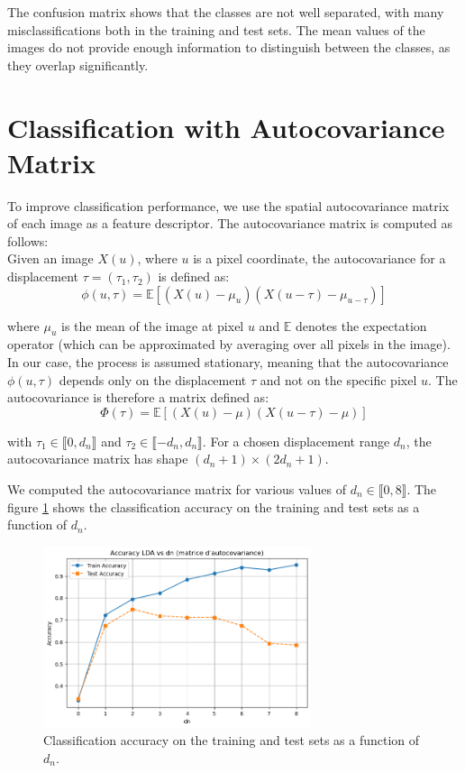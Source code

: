 \documentclass[12pt,a4paper]{article}
\begin{document}
The confusion matrix shows that the classes are not well separated, with many misclassifications both in the training and test sets.
The mean values of the images do not provide enough information to distinguish between the classes, as they overlap significantly.


\section{Classification with Autocovariance Matrix}

To improve classification performance, we use the spatial autocovariance matrix of each image as a feature descriptor.
The autocovariance matrix is computed as follows: \\

Given an image $X(u)$, where $u$ is a pixel coordinate, the autocovariance for a displacement $\tau = (\tau_1, \tau_2)$ is defined as:
\begin{equation}
    \phi(u, \tau) = \mathbb{E} [(X(u)-\mu_u)(X(u-\tau)-\mu_{u-\tau})]
\end{equation}

where $\mu_u$ is the mean of the image at pixel $u$ and $\mathbb{E}$ denotes the expectation operator (which can be approximated by averaging over all pixels in the image). \\

In our case, the process is assumed stationary, meaning that the autocovariance $\phi(u, \tau)$ depends only on the displacement $\tau$ and not on the specific pixel $u$.
The autocovariance is therefore a matrix defined as:
\begin{equation}
    \Phi(\tau) = \mathbb{E} [(X(u)-\mu)(X(u-\tau)-\mu)]
\end{equation}

with $\tau_1 \in \llbracket 0, d_n \rrbracket$ and $\tau_2 \in \llbracket -d_n, d_n \rrbracket$.
For a chosen displacement range $d_n$, the autocovariance matrix has shape $(d_n + 1) \times (2d_n + 1)$. \\

\newpage

We computed the autocovariance matrix for various values of $d_n \in \llbracket 0, 8 \rrbracket$.
The figure \ref{fig:accuracy_dn} shows the classification accuracy on the training and test sets as a function of $d_n$.
\begin{figure}[H]
    \centering
    \includegraphics[width=0.7\textwidth]{src/accuracy_dn.png}
    \caption{Classification accuracy on the training and test sets as a function of $d_n$.}
    \label{fig:accuracy_dn}
\end{figure}
\end{document}
